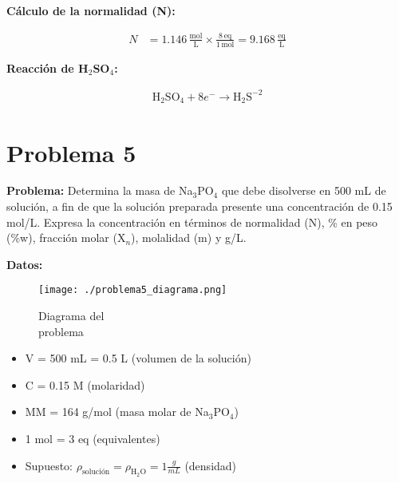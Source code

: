 \documentclass{article}
\begin{document}
\textbf{Cálculo de la normalidad (N):}

\begin{align*}
    N &= 1.146 \, \frac{\text{mol}}{\text{L}} \times \frac{8 \, \text{eq}}{1 \, \text{mol}} = 9.168 \, \frac{\text{eq}}{\text{L}}
\end{align*}

\textbf{Reacción de H$_2$SO$_4$:}

\begin{align*}
    \text{H}_2\text{SO}_4 + 8e^- \rightarrow \text{H}_2\text{S}^{-2} %
\end{align*}










\newpage
\section*{Problema 5}
\textbf{Problema:} Determina la masa de Na$_3$PO$_4$ que debe disolverse en 500 mL de solución, a fin de que la solución preparada presente una concentración de 0.15 mol/L. Expresa la concentración en términos de normalidad (N), \% en peso (\%w), fracción molar (X$_n$), molalidad (m) y g/L.

\noindent\textbf{Datos:} %

\begin{figure}[H]
    \begin{minipage}[t]{0.3\textwidth} %
        \raggedright %
        \texttt{[image: ./problema5\_diagrama.png]} %
        \caption{Diagrama del \\ problema}
    \end{minipage}
\end{figure}

\textbf{} %
\begin{itemize}
\item V = 500 mL = 0.5 L (volumen de la solución)
\item C = 0.15 M (molaridad)
\item MM = 164 g/mol (masa molar de Na$_3$PO$_4$)
\item 1 mol = 3 eq (equivalentes)
\item Supuesto: $\rho_{\text{solución}} = \rho_{\text{H}_2\text{O}} = 1 \frac{g}{mL}$ (densidad)
\end{itemize}
\end{document}
